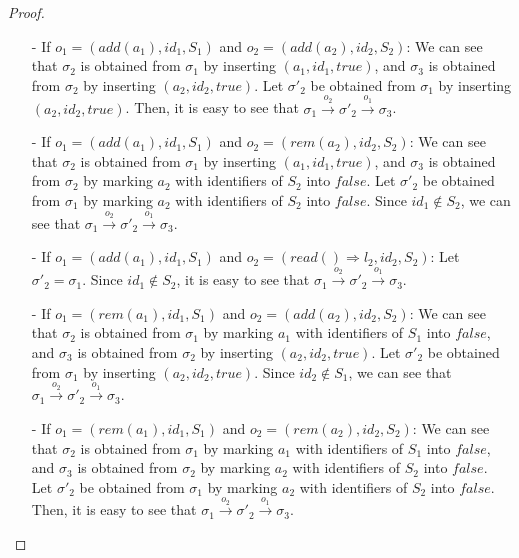 {\begin {proof}
\begin{itemize}
    \begin{itemize}
    \setlength{\itemsep}{0.5pt}
    \item[-] If $o_1 = (\mathit{add}(a_1),\mathit{id}_1,S_1)$ and $o_2 = (\mathit{add}(a_2),\mathit{id}_2,S_2)$: We can see that $\sigma_2$ is obtained from $\sigma_1$ by inserting $(a_1,\mathit{id}_1,\mathit{true})$, and $\sigma_3$ is obtained from $\sigma_2$ by inserting $(a_2,\mathit{id}_2,\mathit{true})$. Let $\sigma'_2$ be obtained from $\sigma_1$ by inserting $(a_2,\mathit{id}_2,\mathit{true})$. Then, it is easy to see that $\sigma_1 {\xrightarrow{o_2}} \sigma'_2 {\xrightarrow{o_1}} \sigma_3$.

    \item[-] If $o_1 = (\mathit{add}(a_1),\mathit{id}_1,S_1)$ and $o_2 = (\mathit{rem}(a_2),\mathit{id}_2,S_2)$: We can see that $\sigma_2$ is obtained from $\sigma_1$ by inserting $(a_1,\mathit{id}_1,\mathit{true})$, and $\sigma_3$ is obtained from $\sigma_2$ by marking $a_2$ with identifiers of $S_2$ into $\mathit{false}$. Let $\sigma'_2$ be obtained from $\sigma_1$ by marking $a_2$ with identifiers of $S_2$ into $\mathit{false}$. Since $\mathit{id_1} \notin S_2$, we can see that $\sigma_1 {\xrightarrow{o_2}} \sigma'_2 {\xrightarrow{o_1}} \sigma_3$.

    \item[-] If $o_1 = (\mathit{add}(a_1),\mathit{id}_1,S_1)$ and $o_2 = (\mathit{read}() \Rightarrow l_2,\mathit{id}_2,S_2)$: Let $\sigma'_2 = \sigma_1$. Since $\mathit{id}_1 \notin S_2$, it is easy to see that $\sigma_1 {\xrightarrow{o_2}} \sigma'_2 {\xrightarrow{o_1}} \sigma_3$.

    \item[-] If $o_1 = (\mathit{rem}(a_1),\mathit{id}_1,S_1)$ and $o_2 = (\mathit{add}(a_2),\mathit{id}_2,S_2)$: We can see that $\sigma_2$ is obtained from $\sigma_1$ by marking $a_1$ with identifiers of $S_1$ into $\mathit{false}$, and $\sigma_3$ is obtained from $\sigma_2$ by inserting $(a_2,\mathit{id}_2,\mathit{true})$. Let $\sigma'_2$ be obtained from $\sigma_1$ by inserting $(a_2,\mathit{id}_2,\mathit{true})$. Since $\mathit{id}_2 \notin S_1$, we can see that $\sigma_1 {\xrightarrow{o_2}} \sigma'_2 {\xrightarrow{o_1}} \sigma_3$.

    \item[-] If $o_1 = (\mathit{rem}(a_1),\mathit{id}_1,S_1)$ and $o_2 = (\mathit{rem}(a_2),\mathit{id}_2,S_2)$: We can see that $\sigma_2$ is obtained from $\sigma_1$ by marking $a_1$ with identifiers of $S_1$ into $\mathit{false}$, and $\sigma_3$ is obtained from $\sigma_2$ by marking $a_2$ with identifiers of $S_2$ into $\mathit{false}$. Let $\sigma'_2$ be obtained from $\sigma_1$ by marking $a_2$ with identifiers of $S_2$ into $\mathit{false}$. Then, it is easy to see that $\sigma_1 {\xrightarrow{o_2}} \sigma'_2 {\xrightarrow{o_1}} \sigma_3$.


\end{itemize}
\end{itemize}
\end{proof}}
